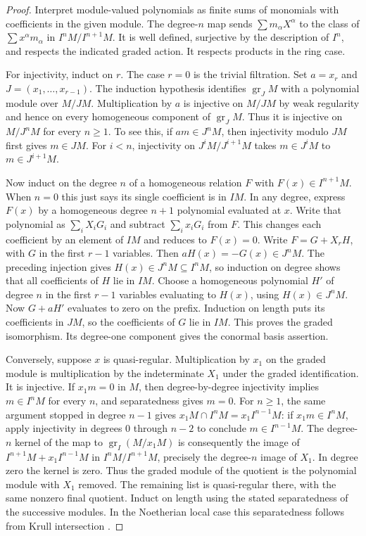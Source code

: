 \documentclass[11pt,oneside,openany]{book}
\theoremstyle{definition}
\theoremstyle{remark}
\begin{document}
\begin{proof}
Interpret module-valued polynomials as finite sums of
monomials with coefficients in the given module. The
degree-$n$ map sends $\sum m_\alpha X^\alpha$ to the class of
$\sum x^\alpha m_\alpha$ in $I^nM/I^{n+1}M$. It is well
defined, surjective by the description of $I^n$, and respects
the indicated graded action. It respects products in the
ring case.

For injectivity, induct on $r$. The case $r=0$ is the trivial
filtration. Set $a=x_r$ and $J=(x_1,\ldots,x_{r-1})$. The induction
hypothesis identifies $\operatorname{gr}_J M$ with a polynomial
module over $M/JM$. Multiplication by $a$ is injective on $M/JM$
by weak regularity and hence on every homogeneous component of
$\operatorname{gr}_J M$. Thus it is injective on $M/J^nM$ for every
$n\ge1$. To see this, if $am\in J^nM$, then injectivity modulo $JM$
first gives $m\in JM$. For $i<n$, injectivity on
$J^iM/J^{i+1}M$ takes $m\in J^iM$ to $m\in J^{i+1}M$.

Now induct on the degree $n$ of a homogeneous relation $F$ with
$F(x)\in I^{n+1}M$. When $n=0$ this just says its single coefficient
is in $IM$. In any degree, express $F(x)$ by a homogeneous degree
$n+1$ polynomial evaluated at $x$. Write that polynomial as
$\sum_i X_iG_i$ and subtract $\sum_i x_iG_i$ from $F$.
This changes each coefficient by an element of $IM$ and reduces
to $F(x)=0$. Write $F=G+X_rH$, with $G$ in the first $r-1$
variables. Then $aH(x)=-G(x)\in J^nM$. The preceding injection
gives $H(x)\in J^nM\subseteq I^nM$, so induction on degree
shows that all coefficients of $H$ lie in $IM$. Choose a
homogeneous polynomial $H'$ of degree $n$ in the first $r-1$
variables evaluating to $H(x)$, using $H(x)\in J^nM$.
Now $G+aH'$ evaluates to zero on the prefix. Induction on
length puts its coefficients in $JM$, so the coefficients of
$G$ lie in $IM$. This proves the graded isomorphism.
Its degree-one component gives the conormal basis assertion.

Conversely, suppose $x$ is quasi-regular. Multiplication
by $x_1$ on the graded module is multiplication by the indeterminate
$X_1$ under the graded identification. It is injective. If
$x_1m=0$ in $M$, then degree-by-degree injectivity implies
$m\in I^nM$ for every $n$, and separatedness gives $m=0$.
For $n\ge1$, the same argument stopped in degree $n-1$ gives
$x_1M\cap I^nM=x_1I^{n-1}M$: if $x_1m\in I^nM$, apply
injectivity in degrees $0$ through $n-2$ to conclude
$m\in I^{n-1}M$. The degree-$n$ kernel of the map to
$\operatorname{gr}_I(M/x_1M)$ is consequently the image of
$I^{n+1}M+x_1 I^{n-1}M$ in $I^nM/I^{n+1}M$, precisely the
degree-$n$ image of $X_1$. In degree zero the kernel is zero.
Thus the graded module of the quotient is the polynomial
module with $X_1$ removed. The remaining list is quasi-regular
there, with the same nonzero final quotient. Induct on length
using the stated separatedness of the successive modules.
In the Noetherian local case this separatedness follows from
Krull intersection \cite[Theorem ALG-05-C04-R04]{p103}.
\end{proof}
\end{document}
